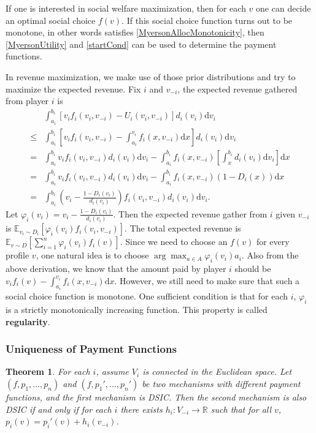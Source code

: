 \documentclass[openany]{book}
\newtheorem{theorem}{Theorem}[chapter]
\theoremstyle{remark}
\begin{document}
If one is interested in social welfare maximization, then for each $v$ one can decide an optimal social choice $f(v)$. If this social choice function turns out to be monotone, in other words satisfies \eqref{MyersonAllocMonotonicity}, then \eqref{MyersonUtility} and \eqref{startCond} can be used to determine the payment functions.

In revenue maximization, we make use of those prior distributions and try to maximize the expected revenue. Fix $i$ and $v_{-i}$, the expected revenue gathered from player $i$ is
\begin{equation*}
    \begin{array}{cl}
         & \displaystyle\int_{a_i}^{b_i}\left[v_if_i(v_i,v_{-i})-U_i(v_i,v_{-i})\right]d_i(v_i)\mathrm{d}v_i \\
        \le & \displaystyle\int_{a_i}^{b_i}\left[v_if_i(v_i,v_{-i})-\int_{a_i}^{v_i}f_i(x,v_{-i})\mathrm{d}x\right]d_i(v_i)\mathrm{d}v_i \\
        = & \displaystyle\int_{a_i}^{b_i}v_if_i(v_i,v_{-i})d_i(v_i)\mathrm{d}v_i-\int_{a_i}^{b_i}f_i(x,v_{-i})\left[\int_x^{b_i}d_i(v_i)\mathrm{d}v_i\right]\mathrm{d}x \\
        = & \displaystyle\int_{a_i}^{b_i}v_if_i(v_i,v_{-i})d_i(v_i)\mathrm{d}v_i-\int_{a_i}^{b_i}f_i(x,v_{-i})(1-D_i(x))\mathrm{d}x \\
        = & \displaystyle\int_{a_i}^{b_i}\left(v_i-\frac{1-D_i(v_i)}{d_i(v_i)}\right)f_i(v_i,v_{-i})d_i(v_i)\mathrm{d}v_i.
    \end{array}
\end{equation*}
Let $\varphi_i(v_i)=v_i-\frac{1-D_i(v_i)}{d_i(v_i)}$. Then the expected revenue gather from $i$ given $v_{-i}$ is $\mathbb{E}_{v_i\sim D_i}[\varphi_i(v_i)f_i(v_i,v_{-i})]$. The total expected revenue is $\mathbb{E}_{v\sim D}[\sum_{i=1}^{n}\varphi_i(v_i)f_i(v)]$. Since we need to choose an $f(v)$ for every profile $v$, one natural idea is to choose $\arg\max_{a\in A}\varphi_i(v_i)a_i$. Also from the above derivation, we know that the amount paid by player $i$ should be $v_if_i(v)-\int_{a_i}^{v_i}f_i(x,v_{-i})\mathrm{d}x$. However, we still need to make sure that such a social choice function is monotone. One sufficient condition is that for each $i$, $\varphi_i$ is a strictly monotonically increasing function. This property is called \textbf{regularity}.

\subsubsection{Uniqueness of Payment Functions}
\begin{theorem}
    For each $i$, assume $V_i$ is connected in the Euclidean space. Let $(f,p_1,\ldots,p_n)$ and $(f,p_1',\ldots,p_n')$ be two mechanisms with different payment functions, and the first mechanism is DSIC. Then the second mechanism is also DSIC if and only if for each $i$ there exists $h_i:V_{-i}\to \mathbb{R}$ such that for all $v$, $p_i(v)=p_i'(v)+h_i(v_{-i})$.
\end{theorem}
\end{document}
